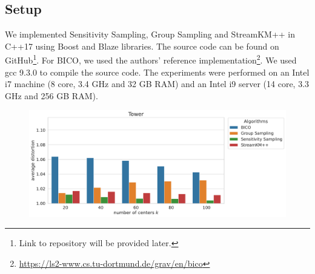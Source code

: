 \subsection{Setup}
We implemented Sensitivity Sampling, Group Sampling and StreamKM++ in C++17 using Boost and Blaze libraries. The source code can be found on GitHub\footnote{Link to repository will be provided later.}. For BICO, we used the authors' reference implementation\footnote{\url{https://ls2-www.cs.tu-dortmund.de/grav/en/bico}}. We used gcc 9.3.0 to compile the source code.
The experiments were performed on an Intel i7 machine (8 core, 3.4 GHz and 32 GB RAM) and an Intel i9 server (14 core, 3.3 GHz and 256 GB RAM).

\begin{figure}
  \includegraphics[width=.65\linewidth]{figures/distortions-Tower.pdf}
  \newline \newline
  \newline \newline
\end{figure}
